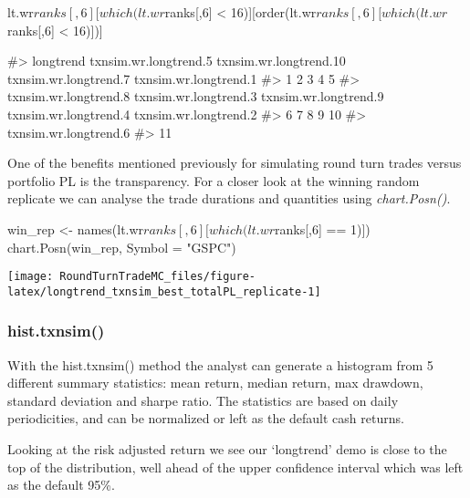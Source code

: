 \begin{Schunk}
\begin{Sinput}
lt.wr$ranks[,6][which(lt.wr$ranks[,6] < 16)][order(lt.wr$ranks[,6][which(lt.wr$ranks[,6] < 16)])]
\end{Sinput}
\begin{Soutput}
#>              longtrend  txnsim.wr.longtrend.5 txnsim.wr.longtrend.10  txnsim.wr.longtrend.7  txnsim.wr.longtrend.1 
#>                      1                      2                      3                      4                      5 
#>  txnsim.wr.longtrend.8  txnsim.wr.longtrend.3  txnsim.wr.longtrend.9  txnsim.wr.longtrend.4  txnsim.wr.longtrend.2 
#>                      6                      7                      8                      9                     10 
#>  txnsim.wr.longtrend.6 
#>                     11
\end{Soutput}
\end{Schunk}

One of the benefits mentioned previously for simulating round turn
trades versus portfolio PL is the transparency. For a closer look at the
winning random replicate we can analyse the trade durations and
quantities using \emph{chart.Posn()}.

\begin{Schunk}
\begin{Sinput}
win_rep <- names(lt.wr$ranks[,6][which(lt.wr$ranks[,6] == 1)])
chart.Posn(win_rep, Symbol = "GSPC")
\end{Sinput}


\begin{center}\texttt{[image: RoundTurnTradeMC\_files/figure-latex/longtrend\_txnsim\_best\_totalPL\_replicate-1]} \end{center}

\end{Schunk}

\hypertarget{hist.txnsim}{%
\subsubsection{hist.txnsim()}\label{hist.txnsim}}

With the hist.txnsim() method the analyst can generate a histogram from
5 different summary statistics: mean return, median return, max
drawdown, standard deviation and sharpe ratio. The statistics are based
on daily periodicities, and can be normalized or left as the default
cash returns.

Looking at the risk adjusted return we see our `longtrend' demo is close
to the top of the distribution, well ahead of the upper confidence
interval which was left as the default 95\%.

